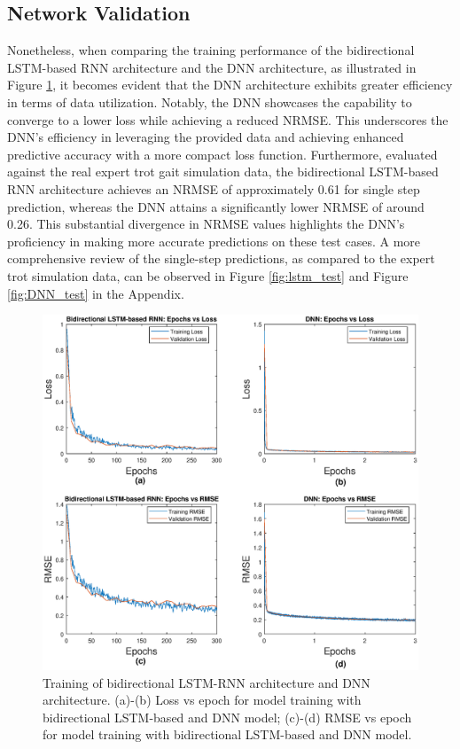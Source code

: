 \subsection{Network Validation}
Nonetheless, when comparing the training performance of the bidirectional LSTM-based RNN architecture and the DNN architecture, as illustrated in Figure \ref{fig:train2net}, it becomes evident that the DNN architecture exhibits greater efficiency in terms of data utilization. Notably, the DNN showcases the capability to converge to a lower loss while achieving a reduced \ac{NRMSE}. This underscores the DNN's efficiency in leveraging the provided data and achieving enhanced predictive accuracy with a more compact loss function. Furthermore, evaluated against the real expert trot gait simulation data, the bidirectional LSTM-based RNN architecture achieves an NRMSE of approximately 0.61 for single step prediction, whereas the DNN attains a significantly lower NRMSE of around 0.26. This substantial divergence in NRMSE values highlights the DNN's proficiency in making more accurate predictions on these test cases. A more comprehensive review of the single-step predictions, as compared to the expert trot simulation data, can be observed in Figure \ref{fig:lstm_test} and Figure \ref{fig:DNN_test} in the Appendix.

\begin{figure}[H]
    \centering
    \includegraphics[width=\linewidth]{img/chap4/train_result.eps}
    \caption{Training of bidirectional LSTM-RNN architecture and DNN architecture. (a)-(b) Loss vs epoch for model training with bidirectional LSTM-based and DNN model; (c)-(d) RMSE vs epoch for model training with bidirectional LSTM-based and DNN model.}
    \label{fig:train2net}
\end{figure}

